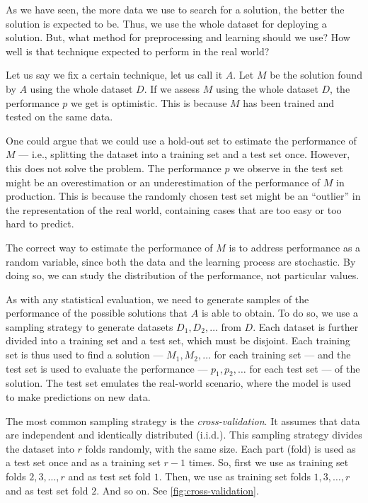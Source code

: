 As we have seen, the more data we use to search for a solution, the better the solution is
expected to be.  Thus, we use the whole dataset for deploying a solution.  But, what
method for preprocessing and learning should we use?  How well is that technique
expected to perform in the real world?

Let us say we fix a certain technique, let us call it $A$.  Let $M$ be the solution found
by $A$ using the whole dataset $D$.  If we assess $M$ using the whole dataset $D$, the
performance $p$ we get is optimistic.  This is because $M$ has been trained and tested
on the same data.

One could argue that we could use a hold-out set to estimate the performance of $M$ ---
i.e., splitting the dataset into a training set and a test set once.  However, this does
not solve the problem.  The performance $p$ we observe in the test set might be an overestimation
or an underestimation of the performance of $M$ in production.  This is because the
randomly chosen test set might be an ``outlier'' in the representation of the real world,
containing cases that are too easy or too hard to predict.

The correct way to estimate the performance of $M$ is to address performance as a
random variable, since both the data and the learning process are stochastic.
By doing so, we can study the distribution of the performance, not particular values.

As with any statistical evaluation, we need to generate samples
of the performance of the possible solutions that $A$ is able to obtain. To do so, we use
a sampling strategy to generate datasets $D_1, D_2, \ldots$ from $D$.  Each
dataset is further divided into a training set and a test set, which must be disjoint.
Each training set is thus used to find a solution --- $M_1, M_2, \ldots$ for each
training set --- and the test set is used to evaluate the performance --- $p_1, p_2,
\ldots$ for each test set --- of the solution.  The test set emulates the real-world
scenario, where the model is used to make predictions on new data.

The most common sampling strategy is the \emph{cross-validation}.  It assumes that data are
independent and identically distributed (i.i.d.).  This sampling strategy divides
the dataset into $r$ folds randomly, with the same size.  Each part (fold) is used as a
test set once and as a training set $r-1$ times.  So, first we use as training set folds
$2, 3, \ldots, r$ and as test set fold $1$.  Then, we use as training set folds $1, 3,
\ldots, r$ and as test set fold $2$. And so on.  See \cref{fig:cross-validation}.

